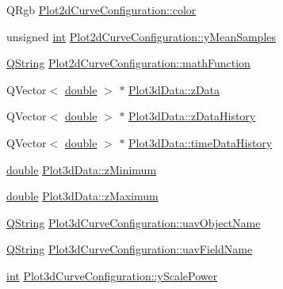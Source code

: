 \begin{DoxyCompactItemize}
\item 
Q\-Rgb \hyperlink{group___scope_plugin_ga287675d34d68fc61f7de6bc82fed788d}{Plot2d\-Curve\-Configuration\-::color}
\item 
unsigned \hyperlink{ioapi_8h_a787fa3cf048117ba7123753c1e74fcd6}{int} \hyperlink{group___scope_plugin_gabe6fab440d33b0a9cb4ad4db2950c26d}{Plot2d\-Curve\-Configuration\-::y\-Mean\-Samples}
\item 
\hyperlink{group___u_a_v_objects_plugin_gab9d252f49c333c94a72f97ce3105a32d}{Q\-String} \hyperlink{group___scope_plugin_gac0be9d46aeaed52d3ee1e796946969ed}{Plot2d\-Curve\-Configuration\-::math\-Function}
\item 
Q\-Vector$<$ \hyperlink{_super_l_u_support_8h_a8956b2b9f49bf918deed98379d159ca7}{double} $>$ $\ast$ \hyperlink{group___scope_plugin_gad5607d9145f51871817c4094cd1ba250}{Plot3d\-Data\-::z\-Data}
\item 
Q\-Vector$<$ \hyperlink{_super_l_u_support_8h_a8956b2b9f49bf918deed98379d159ca7}{double} $>$ $\ast$ \hyperlink{group___scope_plugin_gab1e0ead20c4c64f78a8dafc2ae101710}{Plot3d\-Data\-::z\-Data\-History}
\item 
Q\-Vector$<$ \hyperlink{_super_l_u_support_8h_a8956b2b9f49bf918deed98379d159ca7}{double} $>$ $\ast$ \hyperlink{group___scope_plugin_ga92914eba20188371aeb3ad365c01acc4}{Plot3d\-Data\-::time\-Data\-History}
\item 
\hyperlink{_super_l_u_support_8h_a8956b2b9f49bf918deed98379d159ca7}{double} \hyperlink{group___scope_plugin_ga0938aa53ec304cabf25b8294dde0a5b0}{Plot3d\-Data\-::z\-Minimum}
\item 
\hyperlink{_super_l_u_support_8h_a8956b2b9f49bf918deed98379d159ca7}{double} \hyperlink{group___scope_plugin_ga1ad4417e8b0fb7035d1f4c85191812a0}{Plot3d\-Data\-::z\-Maximum}
\item 
\hyperlink{group___u_a_v_objects_plugin_gab9d252f49c333c94a72f97ce3105a32d}{Q\-String} \hyperlink{group___scope_plugin_gae997da1be9b0e82a84d8d19292c28984}{Plot3d\-Curve\-Configuration\-::uav\-Object\-Name}
\item 
\hyperlink{group___u_a_v_objects_plugin_gab9d252f49c333c94a72f97ce3105a32d}{Q\-String} \hyperlink{group___scope_plugin_ga16c893aa5d7da613ba51f6bd7bf70fc8}{Plot3d\-Curve\-Configuration\-::uav\-Field\-Name}
\item 
\hyperlink{ioapi_8h_a787fa3cf048117ba7123753c1e74fcd6}{int} \hyperlink{group___scope_plugin_gafedb70e83328587c7a6e336f7899a247}{Plot3d\-Curve\-Configuration\-::y\-Scale\-Power}
\item 

\end{DoxyCompactItemize}
